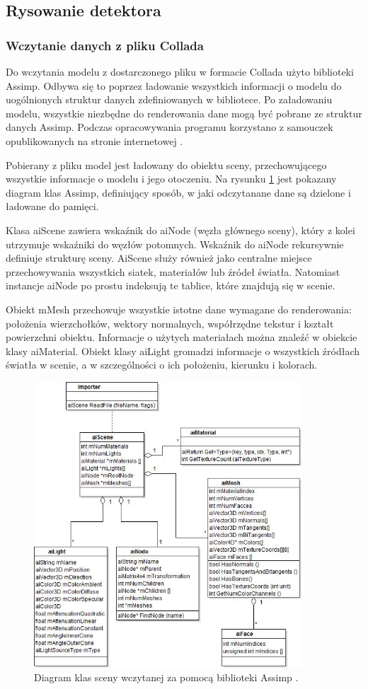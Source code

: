 \subsection{Rysowanie detektora}
\subsubsection{Wczytanie danych z pliku Collada}
Do wczytania modelu z dostarczonego pliku w formacie Collada użyto biblioteki Assimp. Odbywa się to poprzez ładowanie wszystkich informacji o modelu do uogólnionych struktur danych zdefiniowanych w bibliotece. Po załadowaniu modelu, wszystkie niezbędne do renderowania dane mogą być pobrane ze struktur danych Assimp. Podczas opracowywania programu korzystano z samouczek opublikowanych na stronie internetowej \cite{learnopengl}. 

Pobierany z pliku model jest ładowany do obiektu sceny, przechowującego wszystkie informacje o modelu i jego otoczeniu. Na rysunku \ref{rys14} jest pokazany diagram klas Assimp, definiujący sposób, w jaki odczytanane dane są dzielone i ładowane do pamięci.

Klasa aiScene zawiera wskaźnik do aiNode (węzła głównego sceny), który z kolei utrzymuje wskaźniki do węzłów potomnych. Wskaźnik do aiNode rekursywnie definiuje strukturę sceny. AiScene służy również jako centralne miejsce przechowywania wszystkich siatek, materiałów lub źródeł światła. Natomiast instancje aiNode po prostu indeksują te tablice, które znajdują się w scenie.

Obiekt mMesh przechowuje wszystkie istotne dane wymagane do renderowania: położenia wierzchołków, wektory normalnych, współrzędne tekstur i kształt powierzchni obiektu. Informacje o użytych materiałach można znaleźć w obiekcie klasy aiMaterial. Obiekt klasy aiLight gromadzi informacje o wszystkich źródłach światła w scenie, a w szczególności o ich położeniu, kierunku i kolorach. 

\begin{figure}[H]
		\centering
 		\includegraphics[width=10.0cm]{assimpClasses.jpg}
    	\caption{Diagram klas sceny wczytanej za pomocą biblioteki Assimp \cite{assimpImport}.}
 		\label{rys14}
\end{figure}

